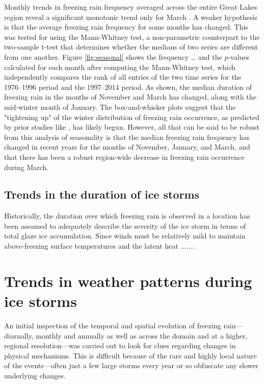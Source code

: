 \documentclass[twocol]{ametsoc}
\begin{document}
Monthly trends in freezing rain frequency averaged across the entire Great Lakes region reveal a significant monotonic trend only for March . A weaker hypothesis is that the average freezing rain frequency for some months has changed. This was tested for using the Mann-Whitney test, a non-parametric counterpart to the two-sample t-test that determines whether the medians of two series are different from one another. Figure \ref{fig:seasonal} shows the frequency … and the $p$-values calculated for each month after computing the Mann-Whitney test, which independently compares the rank of all entries of the two time series for the 1976--1996 period and the 1997--2014 period. As shown, the median duration of freezing rain in the months of November and March has changed, along with the mid-winter month of January. The box-and-whisker plots suggest that the "tightening up" of the winter distribution of freezing rain occurrence, as predicted by prior studies like \citet{cheng2011possible}, has likely begun. However, all that can be said to be robust from this analysis of seasonality is that the median freezing rain frequency has changed in recent years for the months of November, January, and March, and that there has been a robust region-wide decrease in freezing rain occurrence during March.

\subsection{Trends in the duration of ice storms}
Historically, the duration over which freezing rain is observed in a location has been assumed to adequately describe the severity of the ice storm in terms of total glaze ice accumulation. Since winds must be relatively mild to maintain above-freezing surface temperatures and the latent heat .......


\section{Trends in weather patterns during ice storms}
An initial inspection of the temporal and spatial evolution of freezing rain---diurnally, monthly and annually as well as across the domain and at a higher, regional resolution---was carried out to look for clues regarding changes in physical mechanisms. This is difficult because of the rare and highly local nature of the events---often just a few large storms every year or so obfuscate any slower underlying changes.
\end{document}
